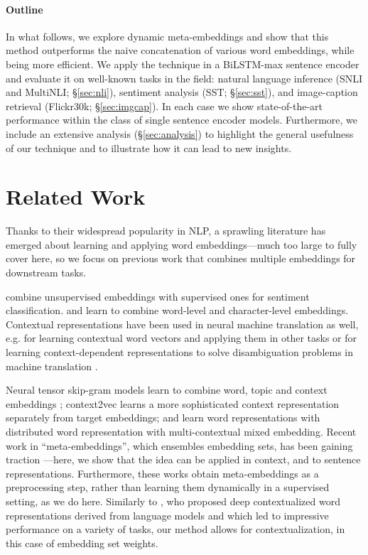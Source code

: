 \documentclass[11pt,a4paper]{article}
\begin{document}
\paragraph{Outline} In what follows, we explore dynamic meta-embeddings and show that this method outperforms the naive concatenation of various word embeddings, while being more efficient. We apply the technique in a BiLSTM-max sentence encoder \cite{Conneau:2017emnlp} and evaluate it on well-known tasks in the field: natural language inference (SNLI and MultiNLI; \S\ref{sec:nli}), sentiment analysis (SST; \S\ref{sec:sst}), and image-caption retrieval (Flickr30k; \S\ref{sec:imgcap}). In each case we show state-of-the-art performance within the class of single sentence encoder models. Furthermore, we include an extensive analysis (\S\ref{sec:analysis}) to highlight the general usefulness of our technique and to illustrate how it can lead to new insights.

\section{Related Work}

Thanks to their widespread popularity in NLP, a sprawling literature has emerged about learning and applying word embeddings---much too large to fully cover here, so we focus on previous work that combines multiple embeddings for downstream tasks.

 combine unsupervised embeddings with supervised ones for sentiment classification.  and  learn to combine word-level and character-level embeddings. Contextual representations have been used in neural machine translation as well, e.g. for learning contextual word vectors and applying them in other tasks \cite{Mccann:2017nips} or for learning context-dependent representations to solve disambiguation problems in machine translation .

Neural tensor skip-gram models learn to combine word, topic and context embeddings \cite{Liu:2015ijcai}; context2vec \cite{Melamud:2016nll} learns a more sophisticated context representation separately from target embeddings; and  learn word representations with distributed word representation with multi-contextual mixed embedding. Recent work in ``meta-embeddings'', which ensembles embedding sets, has been gaining traction \cite{Yin:2015arxiv,Bollegala:2017arxiv,Muromagi:2017nodalida,Coates:2018naacl}---here, we show that the idea can be applied in context, and to sentence representations. Furthermore, these works obtain meta-embeddings as a preprocessing step, rather than learning them dynamically in a supervised setting, as we do here. Similarly to , who proposed deep contextualized word representations derived from language models and which led to impressive performance on a variety of tasks, our method allows for contextualization, in this case of embedding set weights.
\end{document}
